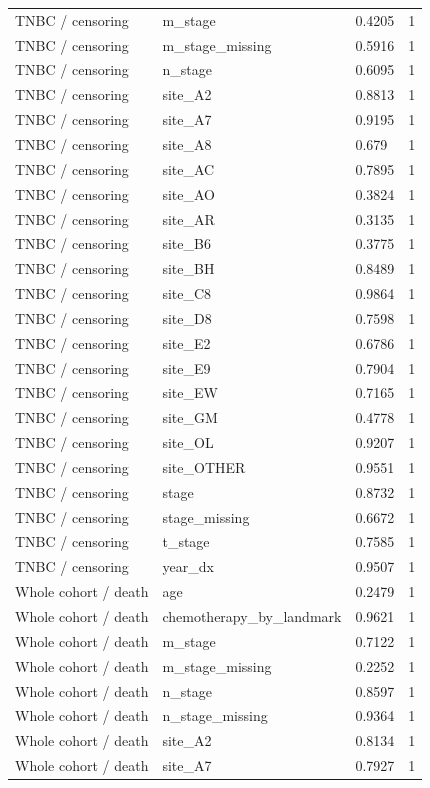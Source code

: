 \documentclass[12pt,letterpaper]{article}
\begin{document}
\begin{longtable}{p{1.55in}p{2.25in}p{0.9in}p{1.1in}}
TNBC / censoring & m\_stage & 0.4205 & 1 \\
TNBC / censoring & m\_stage\_missing & 0.5916 & 1 \\
TNBC / censoring & n\_stage & 0.6095 & 1 \\
TNBC / censoring & site\_A2 & 0.8813 & 1 \\
TNBC / censoring & site\_A7 & 0.9195 & 1 \\
TNBC / censoring & site\_A8 & 0.679 & 1 \\
TNBC / censoring & site\_AC & 0.7895 & 1 \\
TNBC / censoring & site\_AO & 0.3824 & 1 \\
TNBC / censoring & site\_AR & 0.3135 & 1 \\
TNBC / censoring & site\_B6 & 0.3775 & 1 \\
TNBC / censoring & site\_BH & 0.8489 & 1 \\
TNBC / censoring & site\_C8 & 0.9864 & 1 \\
TNBC / censoring & site\_D8 & 0.7598 & 1 \\
TNBC / censoring & site\_E2 & 0.6786 & 1 \\
TNBC / censoring & site\_E9 & 0.7904 & 1 \\
TNBC / censoring & site\_EW & 0.7165 & 1 \\
TNBC / censoring & site\_GM & 0.4778 & 1 \\
TNBC / censoring & site\_OL & 0.9207 & 1 \\
TNBC / censoring & site\_OTHER & 0.9551 & 1 \\
TNBC / censoring & stage & 0.8732 & 1 \\
TNBC / censoring & stage\_missing & 0.6672 & 1 \\
TNBC / censoring & t\_stage & 0.7585 & 1 \\
TNBC / censoring & year\_dx & 0.9507 & 1 \\
Whole cohort / death & age & 0.2479 & 1 \\
Whole cohort / death & chemotherapy\_by\_landmark & 0.9621 & 1 \\
Whole cohort / death & m\_stage & 0.7122 & 1 \\
Whole cohort / death & m\_stage\_missing & 0.2252 & 1 \\
Whole cohort / death & n\_stage & 0.8597 & 1 \\
Whole cohort / death & n\_stage\_missing & 0.9364 & 1 \\
Whole cohort / death & site\_A2 & 0.8134 & 1 \\
Whole cohort / death & site\_A7 & 0.7927 & 1 \\

\end{longtable}
\end{document}
